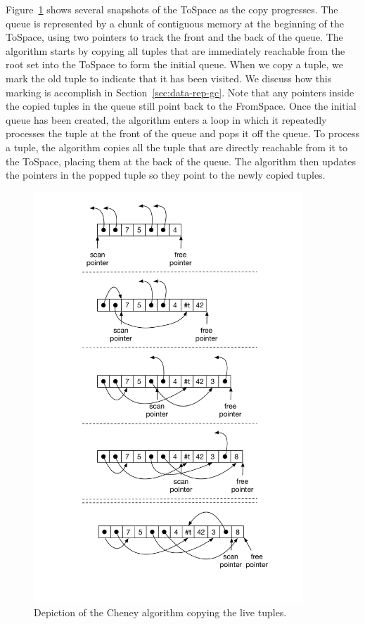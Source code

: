 \documentclass[11pt]{book}
\begin{document}
Figure~\ref{fig:cheney} shows several snapshots of the ToSpace as the
copy progresses. The queue is represented by a chunk of contiguous
memory at the beginning of the ToSpace, using two pointers to track
the front and the back of the queue. The algorithm starts by copying
all tuples that are immediately reachable from the root set into the
ToSpace to form the initial queue.  When we copy a tuple, we mark the
old tuple to indicate that it has been visited. We discuss how this
marking is accomplish in Section~\ref{sec:data-rep-gc}. Note that any
pointers inside the copied tuples in the queue still point back to the
FromSpace. Once the initial queue has been created, the algorithm
enters a loop in which it repeatedly processes the tuple at the front
of the queue and pops it off the queue.  To process a tuple, the
algorithm copies all the tuple that are directly reachable from it to
the ToSpace, placing them at the back of the queue. The algorithm then
updates the pointers in the popped tuple so they point to the newly
copied tuples.

\begin{figure}[tbp]
\centering \includegraphics[width=0.9\textwidth]{figs/cheney}
\caption{Depiction of the Cheney algorithm copying the live tuples.}
\label{fig:cheney}
\end{figure}
\end{document}
